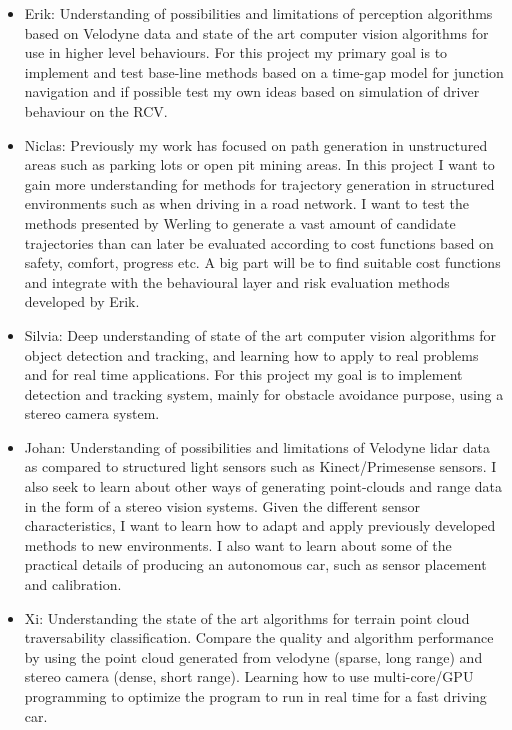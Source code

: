 \documentclass[11pt,a4paper]{article}
\begin{document}
\begin{itemize}
\item 
Erik: Understanding of possibilities and limitations of perception
algorithms based on Velodyne data and state of the art computer
vision algorithms for use in higher level behaviours. For this
project my primary goal is to implement and test base-line methods
based on a time-gap model for junction navigation and if possible
test my own ideas based on simulation of driver behaviour on the RCV.

\item 
Niclas: Previously my work has focused on path generation in
unstructured areas such as parking lots or open pit mining areas. In
this project I want to gain more understanding for methods for
trajectory generation in structured environments such as when
driving in a road network. I want to test the methods presented by
Werling \cite{werling2010tracking} to generate a vast amount of candidate trajectories than can
later be evaluated according to cost functions based on safety,
comfort, progress etc. A big part will be to find suitable cost
functions and integrate with the behavioural layer and risk
evaluation methods developed by Erik.

\item 
Silvia: Deep understanding of state of the art computer vision algorithms for
object detection and tracking, and learning how to apply to real problems and
for real time applications. For this project my goal is to implement detection
and tracking system, mainly for obstacle avoidance purpose, using a stereo camera system.

\item 
Johan: Understanding of possibilities and limitations of Velodyne
lidar data as compared to structured light sensors such as
Kinect/Primesense sensors. I also seek to learn about other ways of
generating point-clouds and range data in the form of a stereo vision
systems. Given the different sensor characteristics, I want to learn
how to adapt and apply previously developed methods to new
environments. I also want to learn about some of the practical
details of producing an autonomous car, such as sensor placement and
calibration.

\item 
Xi: Understanding the state of the art algorithms for terrain point
cloud traversability classification. Compare the quality and
algorithm performance by using the point cloud generated from
velodyne (sparse, long range) and stereo camera (dense, short
range). Learning how to use multi-core/GPU programming to optimize
the program to run in real time for a fast driving car.


\end{itemize}
\end{document}
